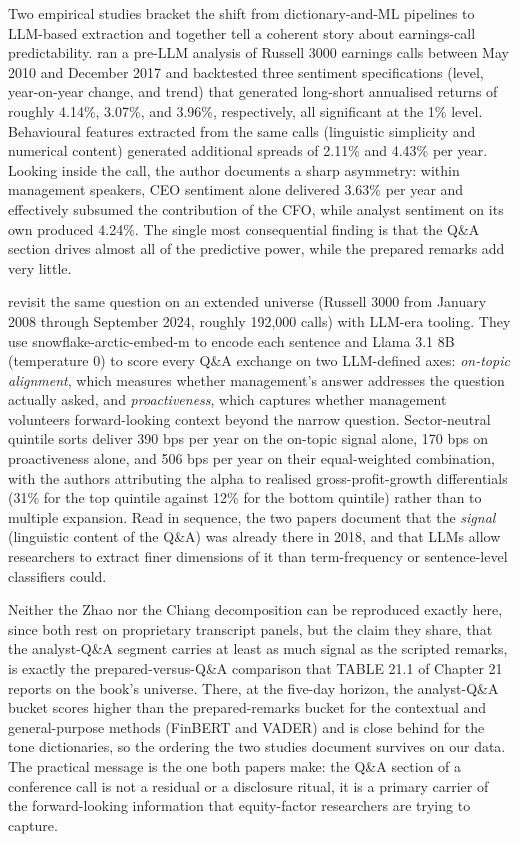 Two empirical studies bracket the shift from dictionary-and-ML pipelines to LLM-based extraction and together tell a coherent story about earnings-call predictability. \cite{zhao2018alpha} ran a pre-LLM analysis of Russell 3000 earnings calls between May 2010 and December 2017 and backtested three sentiment specifications (level, year-on-year change, and trend) that generated long-short annualised returns of roughly 4.14\%, 3.07\%, and 3.96\%, respectively, all significant at the 1\% level. Behavioural features extracted from the same calls (linguistic simplicity and numerical content) generated additional spreads of 2.11\% and 4.43\% per year. Looking inside the call, the author documents a sharp asymmetry: within management speakers, CEO sentiment alone delivered 3.63\% per year and effectively subsumed the contribution of the CFO, while analyst sentiment on its own produced 4.24\%. The single most consequential finding is that the Q\&A section drives almost all of the predictive power, while the prepared remarks add very little.

\cite{chiang2025boardroom} revisit the same question on an extended universe (Russell 3000 from January 2008 through September 2024, roughly 192,000 calls) with LLM-era tooling. They use snowflake-arctic-embed-m to encode each sentence and Llama 3.1 8B (temperature 0) to score every Q\&A exchange on two LLM-defined axes: \textit{on-topic alignment}, which measures whether management's answer addresses the question actually asked, and \textit{proactiveness}, which captures whether management volunteers forward-looking context beyond the narrow question. Sector-neutral quintile sorts deliver 390 bps per year on the on-topic signal alone, 170 bps on proactiveness alone, and 506 bps per year on their equal-weighted combination, with the authors attributing the alpha to realised gross-profit-growth differentials (31\% for the top quintile against 12\% for the bottom quintile) rather than to multiple expansion. Read in sequence, the two papers document that the \textit{signal} (linguistic content of the Q\&A) was already there in 2018, and that LLMs allow researchers to extract finer dimensions of it than term-frequency or sentence-level classifiers could.

Neither the Zhao nor the Chiang decomposition can be reproduced exactly here, since both rest on proprietary transcript panels, but the claim they share, that the analyst-Q\&A segment carries at least as much signal as the scripted remarks, is exactly the prepared-versus-Q\&A comparison that TABLE 21.1 of Chapter 21 reports on the book's universe. There, at the five-day horizon, the analyst-Q\&A bucket scores higher than the prepared-remarks bucket for the contextual and general-purpose methods (FinBERT and VADER) and is close behind for the tone dictionaries, so the ordering the two studies document survives on our data. The practical message is the one both papers make: the Q\&A section of a conference call is not a residual or a disclosure ritual, it is a primary carrier of the forward-looking information that equity-factor researchers are trying to capture.

